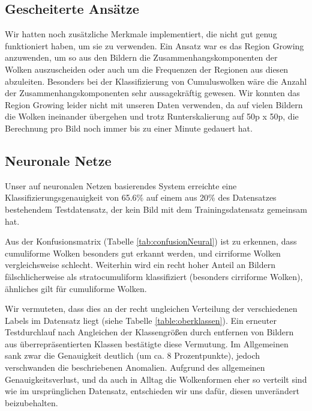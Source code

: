 \documentclass[a4,german]{article}
\begin{document}
\subsection{Gescheiterte Ansätze}
Wir hatten noch zusätzliche Merkmale implementiert, die nicht gut genug funktioniert haben, um sie zu verwenden.
Ein Ansatz war es das Region Growing anzuwenden, um so aus den Bildern die Zusammenhangskomponenten der Wolken auszuscheiden oder auch um die Frequenzen der Regionen aus diesen abzuleiten.
Besonders bei der Klassifizierung von Cumuluswolken
wäre die Anzahl der Zusammenhangskomponenten sehr aussagekräftig gewesen.
Wir konnten das Region Growing leider nicht mit unseren Daten verwenden, da auf vielen Bildern die Wolken ineinander übergehen und trotz Runterskalierung auf 50p x 50p, die Berechnung pro Bild noch immer bis zu einer Minute gedauert hat.


\subsection{Neuronale Netze}

Unser auf neuronalen Netzen basierendes System erreichte eine Klassifizierungsgenauigkeit von 65.6\% auf einem aus 20\% des Datensatzes bestehendem Testdatensatz, der kein Bild mit dem Trainingsdatensatz gemeinsam hat.

Aus der Konfusionsmatrix (Tabelle \ref{tab:confusionNeural}) ist zu erkennen, dass cumuliforme Wolken besonders gut erkannt werden, und cirriforme Wolken vergleichsweise schlecht.
Weiterhin wird ein recht hoher Anteil an Bildern fälschlicherweise als stratocumuliform klassifiziert (besonders cirriforme Wolken), ähnliches gilt für cumuliforme Wolken.

Wir vermuteten, dass dies an der recht ungleichen Verteilung der verschiedenen Labels im Datensatz liegt (siehe Tabelle \ref{table:oberklassen}).
Ein erneuter Testdurchlauf nach Angleichen der Klassengrößen durch entfernen von Bildern aus überrepräsentierten Klassen bestätigte diese Vermutung.
Im Allgemeinen sank zwar die Genauigkeit deutlich (um ca. 8 Prozentpunkte), jedoch verschwanden die beschriebenen Anomalien.
Aufgrund des allgemeinen Genauigkeitsverlust, und da auch in Alltag die Wolkenformen eher so verteilt sind wie im ursprünglichen Datensatz, entschieden wir uns dafür, diesen unverändert beizubehalten.
\end{document}
